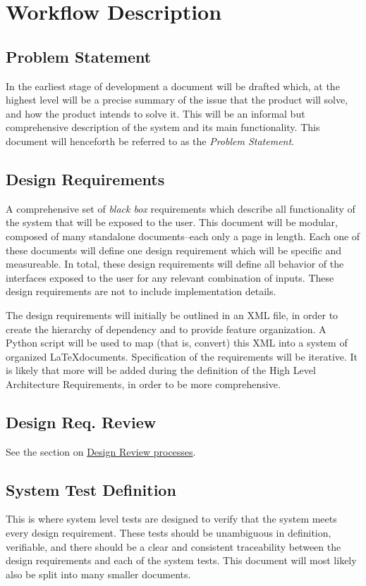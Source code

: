 \documentclass[12pt]{article}
\begin{document}
\section{Workflow Description}
\subsection{Problem Statement}
In the earliest stage of development a document will be drafted which, at the
highest level will be a precise summary of the issue that the product will
solve, and how the product intends to solve it. This will be an informal but
comprehensive description of the system and its main functionality. This
document will henceforth be referred to as the {\it Problem Statement}.

\subsection{Design Requirements}
A comprehensive set of {\it black box} requirements which describe all
functionality of the system that will be exposed to the user. This document
will be modular, composed of many standalone documents--each only a page in
length.
Each one of these documents will define one design requirement which will be
specific and measureable. In total, these design requirements will define all
behavior of the interfaces exposed to the user for any relevant combination of
inputs. These design requirements are not to include implementation details.

The design requirements will initially be outlined in an XML file, in order
to create the hierarchy of dependency and to provide feature organization.
A Python script will be used to map (that is, convert) this XML into a system
of organized \LaTeX documents. Specification of the requirements will be
iterative. It is likely that more will be added during the definition of the
High Level Architecture Requirements, in order to be more comprehensive.

\subsection{Design Req. Review}
See the section on \hyperref[sec:review]{Design Review processes}.
\pagebreak

\subsection{System Test Definition}
This is where system level tests are designed to verify that the system meets
every design requirement. These tests should be unambiguous in definition,
verifiable, and there should be a clear and consistent traceability between
the design requirements and each of the system tests. This document will most
likely also be split into many smaller documents.
\end{document}
